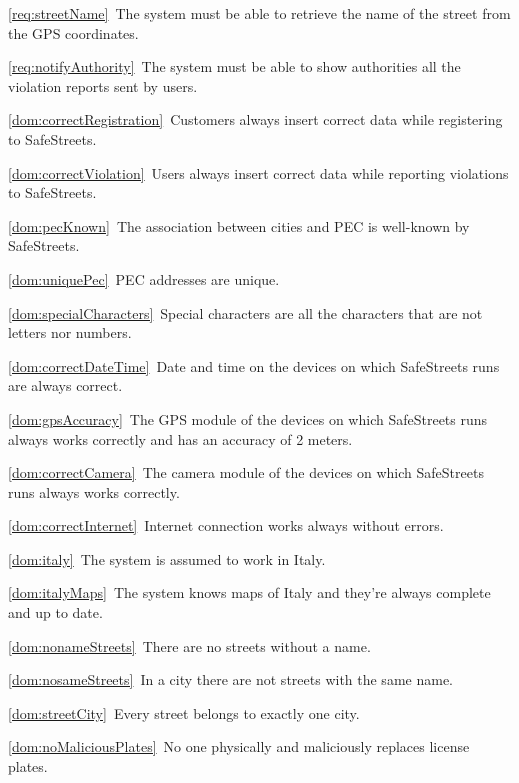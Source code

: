 \begin{description}
\begin{description}
					\item \ref{req:streetName}\ The system must be able to retrieve the name of the street from the GPS coordinates.
					\item \ref{req:notifyAuthority}\ The system must be able to show authorities all the violation reports sent by users.
					\item \ref{dom:correctRegistration}\ Customers always insert correct data while registering to SafeStreets.
					\item \ref{dom:correctViolation}\ Users always insert correct data while reporting violations to SafeStreets.
					\item \ref{dom:pecKnown}\ The association between cities and PEC is well-known by SafeStreets.
					\item \ref{dom:uniquePec}\ PEC addresses are unique.
					\item \ref{dom:specialCharacters}\ Special characters are all the characters that are not letters nor numbers.
					\item \ref{dom:correctDateTime}\ Date and time on the devices on which SafeStreets runs are always correct.
					\item \ref{dom:gpsAccuracy}\ The GPS module of the devices on which SafeStreets runs always works correctly and has an accuracy of 2 meters.
					\item \ref{dom:correctCamera}\ The camera module of the devices on which SafeStreets runs always works correctly.
					\item \ref{dom:correctInternet}\ Internet connection works always without errors.
					\item \ref{dom:italy}\ The system is assumed to work in Italy.
					\item \ref{dom:italyMaps}\ The system knows maps of Italy and they’re always complete and up to date.
					\item \ref{dom:nonameStreets}\ There are no streets without a name.
					\item \ref{dom:nosameStreets}\ In a city there are not streets with the same name.
					\item \ref{dom:streetCity}\ Every street belongs to exactly one city.
					\item \ref{dom:noMaliciousPlates}\ No one physically and maliciously replaces license plates.
				\end{description}
					

\end{description}

